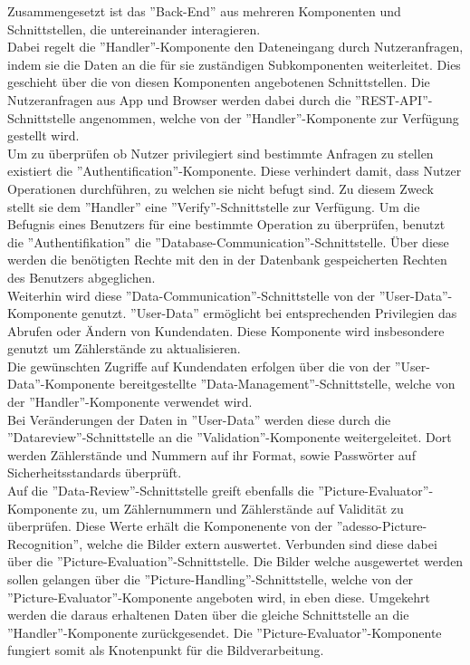 Zusammengesetzt ist das ''Back-End'' aus mehreren Komponenten und Schnittstellen, die untereinander interagieren.\\
Dabei regelt die ''Handler''-Komponente den Dateneingang durch Nutzeranfragen, indem sie die Daten an die für sie zuständigen Subkomponenten weiterleitet. Dies geschieht über die von diesen Komponenten angebotenen Schnittstellen. Die Nutzeranfragen aus App und Browser werden dabei durch die ''REST-API''-Schnittstelle angenommen, welche von der ''Handler''-Komponente zur Verfügung gestellt wird.\\
Um zu überprüfen ob Nutzer privilegiert sind bestimmte Anfragen zu stellen existiert die ''Authentification''-Komponente. Diese verhindert damit, dass Nutzer Operationen durchführen, zu welchen sie nicht befugt sind. Zu diesem Zweck stellt sie dem ''Handler'' eine ''Verify''-Schnittstelle zur Verfügung. Um die Befugnis eines Benutzers für eine bestimmte Operation zu überprüfen, benutzt die ''Authentifikation'' die ''Database-Communication''-Schnittstelle. Über diese werden die benötigten Rechte mit den in der Datenbank gespeicherten Rechten des Benutzers abgeglichen.\\
Weiterhin wird diese ''Data-Communication''-Schnittstelle von der ''User-Data''-Komponente genutzt. ''User-Data'' ermöglicht bei entsprechenden Privilegien das Abrufen oder Ändern von Kundendaten. Diese Komponente wird insbesondere genutzt um Zählerstände zu aktualisieren.\\
Die gewünschten Zugriffe auf Kundendaten erfolgen über die von der ''User-Data''-Komponente bereitgestellte ''Data-Management''-Schnittstelle, welche von der ''Handler''-Komponente verwendet wird.\\
Bei Veränderungen der Daten in ''User-Data'' werden diese durch die ''Datareview''-Schnittstelle an die ''Validation''-Komponente weitergeleitet. Dort werden Zählerstände und Nummern auf ihr Format, sowie Passwörter auf Sicherheitsstandards überprüft.\\
Auf die ''Data-Review''-Schnittstelle greift ebenfalls die ''Picture-Evaluator''-Komponente zu, um Zählernummern und Zählerstände auf Validität zu überprüfen. Diese Werte erhält die Komponenente von der ''adesso-Picture-Recognition'', welche die Bilder extern auswertet. Verbunden sind diese dabei über die ''Picture-Evaluation''-Schnittstelle. Die Bilder welche ausgewertet werden sollen gelangen über die ''Picture-Handling''-Schnittstelle, welche von der ''Picture-Evaluator''-Komponente angeboten wird, in eben diese. Umgekehrt werden die daraus erhaltenen Daten über die gleiche Schnittstelle an die ''Handler''-Komponente zurückgesendet. Die ''Picture-Evaluator''-Komponente fungiert somit als Knotenpunkt für die Bildverarbeitung. 

